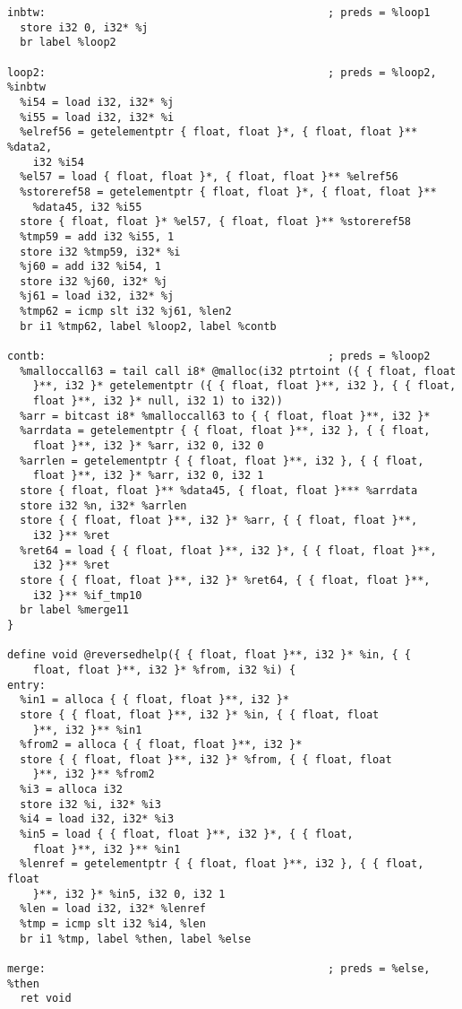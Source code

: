 \documentclass[main.tex]{subfiles}
\begin{document}
{\begin{lstlisting}
inbtw:                                            ; preds = %loop1
  store i32 0, i32* %j
  br label %loop2

loop2:                                            ; preds = %loop2, %inbtw
  %i54 = load i32, i32* %j
  %i55 = load i32, i32* %i
  %elref56 = getelementptr { float, float }*, { float, float }** %data2,
    i32 %i54
  %el57 = load { float, float }*, { float, float }** %elref56
  %storeref58 = getelementptr { float, float }*, { float, float }** 
    %data45, i32 %i55
  store { float, float }* %el57, { float, float }** %storeref58
  %tmp59 = add i32 %i55, 1
  store i32 %tmp59, i32* %i
  %j60 = add i32 %i54, 1
  store i32 %j60, i32* %j
  %j61 = load i32, i32* %j
  %tmp62 = icmp slt i32 %j61, %len2
  br i1 %tmp62, label %loop2, label %contb

contb:                                            ; preds = %loop2
  %malloccall63 = tail call i8* @malloc(i32 ptrtoint ({ { float, float
    }**, i32 }* getelementptr ({ { float, float }**, i32 }, { { float,
    float }**, i32 }* null, i32 1) to i32))
  %arr = bitcast i8* %malloccall63 to { { float, float }**, i32 }*
  %arrdata = getelementptr { { float, float }**, i32 }, { { float, 
    float }**, i32 }* %arr, i32 0, i32 0
  %arrlen = getelementptr { { float, float }**, i32 }, { { float,
    float }**, i32 }* %arr, i32 0, i32 1
  store { float, float }** %data45, { float, float }*** %arrdata
  store i32 %n, i32* %arrlen
  store { { float, float }**, i32 }* %arr, { { float, float }**,
    i32 }** %ret
  %ret64 = load { { float, float }**, i32 }*, { { float, float }**,
    i32 }** %ret
  store { { float, float }**, i32 }* %ret64, { { float, float }**,
    i32 }** %if_tmp10
  br label %merge11
}

define void @reversedhelp({ { float, float }**, i32 }* %in, { {
    float, float }**, i32 }* %from, i32 %i) {
entry:
  %in1 = alloca { { float, float }**, i32 }*
  store { { float, float }**, i32 }* %in, { { float, float 
    }**, i32 }** %in1
  %from2 = alloca { { float, float }**, i32 }*
  store { { float, float }**, i32 }* %from, { { float, float
    }**, i32 }** %from2
  %i3 = alloca i32
  store i32 %i, i32* %i3
  %i4 = load i32, i32* %i3
  %in5 = load { { float, float }**, i32 }*, { { float, 
    float }**, i32 }** %in1
  %lenref = getelementptr { { float, float }**, i32 }, { { float, float 
    }**, i32 }* %in5, i32 0, i32 1
  %len = load i32, i32* %lenref
  %tmp = icmp slt i32 %i4, %len
  br i1 %tmp, label %then, label %else

merge:                                            ; preds = %else, %then
  ret void


\end{lstlisting}}
\end{document}
